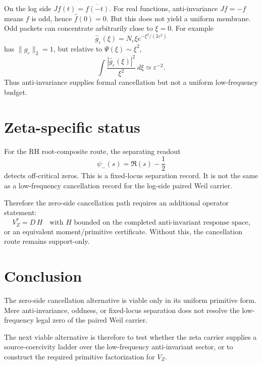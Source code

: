 \documentclass[11pt]{article}
\begin{document}
On the log side \(Jf(t)=\overline{f(-t)}\).  For real functions, anti-invariance \(Jf=-f\) means \(f\) is odd, hence \(\widehat f(0)=0\).  But this does not yield a uniform membrane.  Odd packets can concentrate arbitrarily close to \(\xi=0\).  For example
\[
\widehat g_\varepsilon(\xi)
=
N_\varepsilon \xi e^{-\xi^2/(2\varepsilon^2)}
\]
has \(\|g_\varepsilon\|_2=1\), but relative to \(\Psi(\xi)\sim \xi^2\),
\[
\int \frac{|\widehat g_\varepsilon(\xi)|^2}{\xi^2}\,d\xi
\simeq \varepsilon^{-2}.
\]
Thus anti-invariance supplies formal cancellation but not a uniform low-frequency budget.

\section{Zeta-specific status}

For the RH root-composite route, the separating readout
\[
\psi_-(s)=\Re(s)-\frac12
\]
detects off-critical zeros.  This is a fixed-locus separation record.  It is not the same as a low-frequency cancellation record for the log-side paired Weil carrier.

Therefore the zero-side cancellation path requires an additional operator statement:
\[
V_Z^*=D\,H
\quad\text{with }H\text{ bounded on the completed anti-invariant response space,}
\]
or an equivalent moment/primitive certificate.  Without this, the cancellation route remains support-only.

\section{Conclusion}

The zero-side cancellation alternative is viable only in its uniform primitive form.  Mere anti-invariance, oddness, or fixed-locus separation does not resolve the low-frequency legal zero of the paired Weil carrier.

The next viable alternative is therefore to test whether the zeta carrier supplies a source-coercivity ladder over the low-frequency anti-invariant sector, or to construct the required primitive factorization for \(V_Z\).
\end{document}
